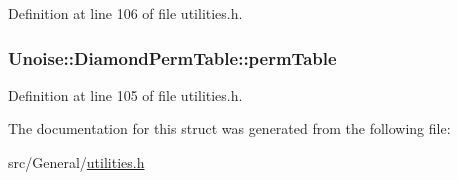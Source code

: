 Definition at line 106 of file utilities.\-h.

\hypertarget{struct_unoise_1_1_diamond_perm_table_abbdd2c631912b46dd642a1742fafc2cc}{
\subsubsection[{perm\-Table}]{ Unoise\-::\-Diamond\-Perm\-Table\-::perm\-Table}}\label{struct_unoise_1_1_diamond_perm_table_abbdd2c631912b46dd642a1742fafc2cc}


Definition at line 105 of file utilities.\-h.



The documentation for this struct was generated from the following file\-:\begin{DoxyCompactItemize}
\item 
src/\-General/\hyperlink{utilities_8h}{utilities.\-h}\end{DoxyCompactItemize}

